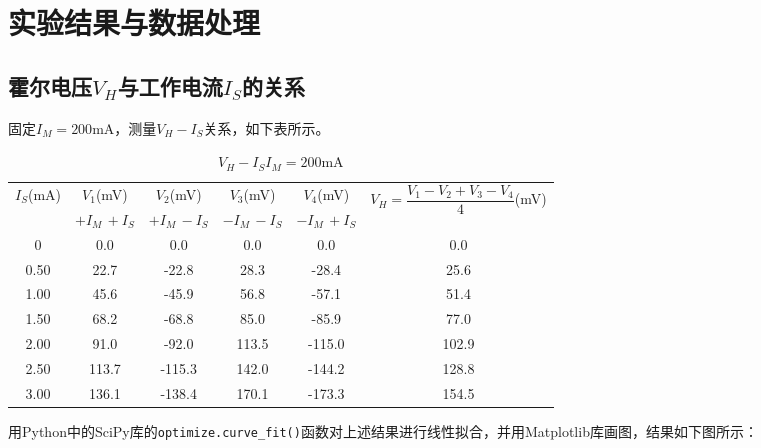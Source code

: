 \documentclass[12pt]{article}
\begin{document}
\section{实验结果与数据处理}
\subsection{霍尔电压$V_H$与工作电流$I_S$的关系}
固定$I_M=200\mathrm{mA}$，测量$V_H-I_S$关系，如下表所示。

\begin{table}[htbp]
    \centering
    \caption{$V_H-I_S$\quad$I_M=200\mathrm{mA}$}
    \begin{tabular}{|c|c|c|c|c|c|}
    \hline
    \multirow{2}{*}{$I_S$(mA)} & $V_1$(mV)    & $V_2$(mV)    & $V_3$(mV)    & $V_4$(mV)    & \multirow{2}{*}{$V_H=\dfrac{V_1-V_2+V_3-V_4}{4}$(mV)} \\ \cline{2-5}
                               & $+I_M\,+I_S$ & $+I_M\,-I_S$ & $-I_M\,-I_S$ & $-I_M\,+I_S$ &                                                  \\ \hline
    0                          & 0.0          & 0.0          & 0.0          & 0.0          & 0.0                                              \\ \hline
    0.50                       & 22.7         & -22.8        & 28.3         & -28.4        & 25.6                                             \\ \hline
    1.00                       & 45.6         & -45.9        & 56.8         & -57.1        & 51.4                                             \\ \hline
    1.50                       & 68.2         & -68.8        & 85.0         & -85.9        & 77.0                                             \\ \hline
    2.00                       & 91.0         & -92.0        & 113.5        & -115.0       & 102.9                                            \\ \hline
    2.50                       & 113.7        & -115.3       & 142.0        & -144.2       & 128.8                                            \\ \hline
    3.00                       & 136.1        & -138.4       & 170.1        & -173.3       & 154.5                                            \\ \hline
    \end{tabular}
\end{table}

用Python中的SciPy库的\verb|optimize.curve_fit()|函数对上述结果进行线性拟合，并用Matplotlib库画图，结果如下图所示：
\end{document}
